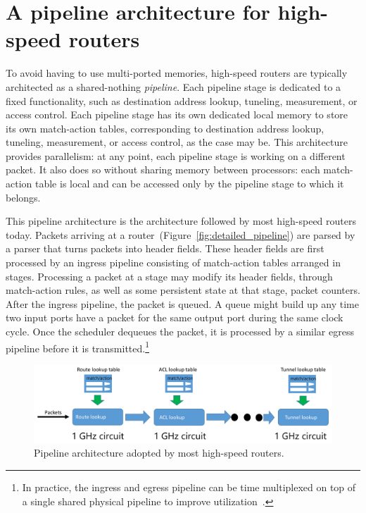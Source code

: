 \section{A pipeline architecture for high-speed routers}
To avoid having to use multi-ported memories, high-speed routers are typically
architected as a shared-nothing {\em pipeline}. Each pipeline stage is
dedicated to a fixed functionality, such as destination address lookup,
tuneling, measurement, or access control. Each pipeline stage has its own
dedicated local memory to store its own match-action tables, corresponding to
destination address lookup, tuneling, measurement, or access control, as the
case may be. This architecture provides parallelism: at any point, each
pipeline stage is working on a different packet. It also does so without
sharing memory between processors: each match-action table is local and can be
accessed only by the pipeline stage to which it belongs.

This pipeline architecture is the architecture followed by most high-speed
routers today. Packets arriving at a
router~(Figure~\ref{fig:detailed_pipeline}) are parsed by a parser that turns
packets into header fields. These header fields are first processed by an
ingress pipeline consisting of match-action tables arranged in stages.
Processing a packet at a stage may modify its header fields, through
match-action rules, as well as some persistent state at that stage, \eg packet
counters. After the ingress pipeline, the packet is queued. A queue might build
up any time two input ports have a packet for the same output port during the
same clock cycle. Once the scheduler dequeues the packet, it is processed by a
similar egress pipeline before it is transmitted.\footnote{In practice, the
ingress and egress pipeline can be time multiplexed on top of a single shared
physical pipeline to improve utilization~\cite{rmt}.}

\begin{figure}[!t]
\includegraphics[width=\textwidth]{pipeline.pdf}
\caption{Pipeline architecture adopted by most high-speed routers.}
\label{fig:pipeline}
\end{figure}

